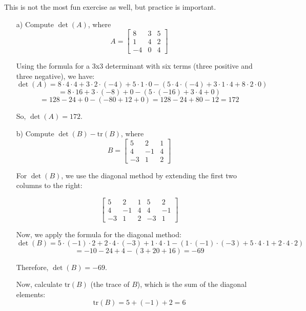 \begin{sol}
    This is not the most fun exercise as well, but practice is important.
    \begin{enumerate}
        \item[a)] Compute $\det(A)$, where 
        \[
        A = \begin{bmatrix} 8 & 3 & 5 \\ 1 & 4 & 2 \\ -4 & 0 & 4 \end{bmatrix}
        \]

        Using the formula for a 3x3 determinant with six terms (three positive and three negative), we have:
        \[
        \det(A) = 8 \cdot 4 \cdot 4 + 3 \cdot 2 \cdot (-4) + 5 \cdot 1 \cdot 0 - (5 \cdot 4 \cdot (-4) + 3 \cdot 1 \cdot 4 + 8 \cdot 2 \cdot 0)
        \]
        \[
        = 8 \cdot 16 + 3 \cdot (-8) + 0 - (5 \cdot (-16) + 3 \cdot 4 + 0)
        \]
        \[
        = 128 - 24 + 0 - (-80 + 12 + 0) = 128 - 24 + 80 - 12 = 172
        \]

        So, $\det(A) = 172$.

        \item[b)] Compute $\det(B) - \text{tr}(B)$, where 
        \[
        B = \begin{bmatrix} 5 & 2 & 1 \\ 4 & -1 & 4 \\ -3 & 1 & 2 \end{bmatrix}
        \]

        For $\det(B)$, we use the diagonal method by extending the first two columns to the right:

        \[
        \begin{bmatrix} 
            5 & 2 & 1 & 5 & 2 \\ 
            4 & -1 & 4 & 4 & -1 \\ 
            -3 & 1 & 2 & -3 & 1 
        \end{bmatrix}
        \]

        Now, we apply the formula for the diagonal method:
        \[
        \det(B) = 5 \cdot (-1) \cdot 2 + 2 \cdot 4 \cdot (-3) + 1 \cdot 4 \cdot 1 - (1 \cdot (-1) \cdot (-3) + 5 \cdot 4 \cdot 1 + 2 \cdot 4 \cdot 2)
        \]
        \[
        = -10 - 24 + 4 - (3 + 20 + 16) = -69
        \]

        Therefore, $\det(B) = -69$.


        Now, calculate $\text{tr}(B)$ (the trace of $B$), which is the sum of the diagonal elements:
        \[
        \text{tr}(B) = 5 + (-1) + 2 = 6
        \]


\end{enumerate}
\end{sol}
